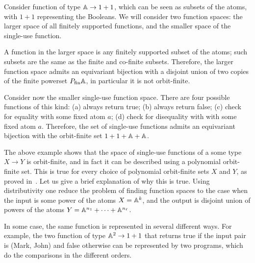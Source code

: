 \begin{example}\label{ex:first-single-use-function-space}
    Consider function of type $\mathbb A \to 1 + 1$, which can be seen as subsets of the atoms, with $1+1$ representing the Booleans. We will consider two function spaces: the larger space of all finitely supported functions, and the smaller space of the single-use function.
    
    A function in the larger space is any finitely supported subset of the atoms; such subsets are the same as the finite and co-finite subsets. Therefore, the larger function space admits an equivariant bijection with a disjoint union of two copies of the finite powerset $\powerset_{\text{fin}} \atoms$, in particular it is not orbit-finite.
    
    Consider now the smaller single-use function space. There are four possible functions of this kind: (a) always return true; (b) always return false; (c) check for equality with some fixed atom $a$; (d) check for disequality with with some fixed atom $a$.  Therefore,  the set of single-use functions  admits an equivariant bijection with the orbit-finite set $1 + 1 + \mathbb A + \mathbb A$.
    \exampleend

\end{example}


The above example shows that the space of single-use functions of a some type $X \to Y$ is orbit-finite, and in fact it can be described using a polynomial orbit-finite set. This is true for every choice of polynomial orbit-finite sets $X$ and $Y$, as proved in~\cite[Theorem 5]{stefanski-phd}. Let us give a brief explanation of why this is true. Using distributivity one reduce the problem of finding function spaces to the case when the input is some power of the atoms $X = \mathbb A^k$, and the output is disjoint union of powers of the atoms $Y = \mathbb A^{n_1} + \cdots + \mathbb A^{n_\ell}$. 

In some case, the same function is represented in several different ways. For example, the two function of type $\mathbb A^2 \to 1 + 1$ that returns true if the input pair is (Mark, John) and false otherwise can be represented by two programs, which do the comparisons in the different orders. 

